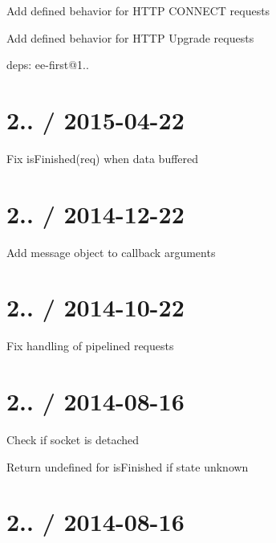 
\begin{DoxyItemize}
\item Add defined behavior for H\+T\+TP {\ttfamily C\+O\+N\+N\+E\+CT} requests
\item Add defined behavior for H\+T\+TP {\ttfamily Upgrade} requests
\item deps\+: ee-\/first@1..
\end{DoxyItemize}

\section*{2.. / 2015-\/04-\/22 }


\begin{DoxyItemize}
\item Fix {\ttfamily is\+Finished(req)} when data buffered
\end{DoxyItemize}

\section*{2.. / 2014-\/12-\/22 }


\begin{DoxyItemize}
\item Add message object to callback arguments
\end{DoxyItemize}

\section*{2.. / 2014-\/10-\/22 }


\begin{DoxyItemize}
\item Fix handling of pipelined requests
\end{DoxyItemize}

\section*{2.. / 2014-\/08-\/16 }


\begin{DoxyItemize}
\item Check if {\ttfamily socket} is detached
\item Return {\ttfamily undefined} for {\ttfamily is\+Finished} if state unknown
\end{DoxyItemize}

\section*{2.. / 2014-\/08-\/16 }


